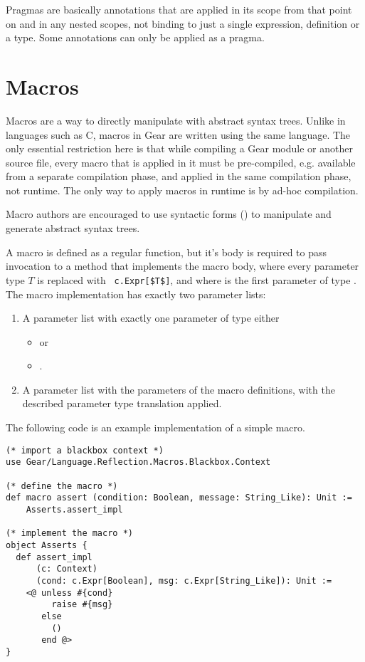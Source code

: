 Pragmas are basically annotations that are applied in its scope from that point on and in any nested scopes, not binding to just a single expression, definition or a type. Some annotations can only be applied as a pragma. 






\section{Macros}
\label{sec:macros}

Macros are a way to directly manipulate with abstract syntax trees. Unlike in languages such as C, macros in Gear are written using the same language. The only essential restriction here is that while compiling a Gear module or another source file, every macro that is applied in it must be pre-compiled, e.g. available from a separate compilation phase, and applied in the same compilation phase, not runtime. The only way to apply macros in runtime is by ad-hoc compilation. 

Macro authors are encouraged to use syntactic forms () to manipulate and generate abstract syntax trees. 

A macro is defined as a regular function, but it's body is required to pass invocation to a method that implements the macro body, where every parameter type $T$ is replaced with ~\lstinline!c.Expr[$T$]!, and where  is the first parameter of type . The macro implementation has exactly two parameter lists: 
\begin{enumerate}
  \item A parameter list with exactly one parameter of type either
    \begin{itemize}
      \item {} or 
      \item {}.
    \end{itemize} 
  \item A parameter list with the parameters of the macro definitions, with the described parameter type translation applied. 
\end{enumerate}

\example The following code is an example implementation of a simple  macro. 
\begin{lstlisting}[deletekeywords={message,assert}]
(* import a blackbox context *)
use Gear/Language.Reflection.Macros.Blackbox.Context

(* define the macro *)
def macro assert (condition: Boolean, message: String_Like): Unit := 
    Asserts.assert_impl

(* implement the macro *)
object Asserts {
  def assert_impl 
      (c: Context)
      (cond: c.Expr[Boolean], msg: c.Expr[String_Like]): Unit :=
    <@ unless #{cond}
         raise #{msg}
       else
         ()
       end @>
}
\end{lstlisting}

